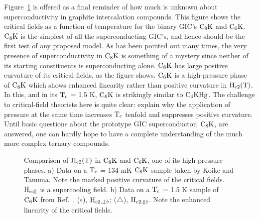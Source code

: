         Figure~\ref{c6k}  is offered as  a   final reminder of  how  much  is
unknown about superconductivity in graphite  intercalation compounds.  This
figure shows  the  critical  fields as a  function  of temperature  for the
binary GIC's $\rm C_8K$ and $\rm C_6K$.  $\rm C_8K$ is  the simplest of all
the superconducting  GIC's, and  hence  should be  the  first  test of  any
proposed model.  As has been  pointed out many times,  the very presence of
superconductivity in $\rm C_8K$ is something of a mystery since  neither of
its starting  constituents   is superconducting  alone.\cite{takada82,M143}
$\rm C_8K$  has large  positive curvature   of its critical  fields, as the
figure  shows.  $\rm  C_6K$ is  a high-pressure  phase of  $\rm C_8K$ which
shows  enhanced  linearity  rather    than   positive   curvature  in  $\rm
H_{c2}(T)$.\cite{avdeev87}   In  this,   and in   its  $\rm     T_c$ =  1.5
K,\cite{avdeev87} $\rm  C_6K$ is strikingly similar   to $\rm C_4KHg$.  The
challenge to critical-field theorists here is quite  clear: explain why the
application of pressure at  the same time increases  $\rm T_c$  tenfold and
suppresses  positive curvature.   Until basic questions about the prototype
GIC superconductor, $\rm C_8K$, are answered, one can hardly hope to have a
complete understanding of the much more complex ternary compounds.

\begin{figure}
\vspace{16cm}
\caption[Comparison of $\rm H_{c2}(T)$ in $\rm C_8K$ and $\rm
C_6K$.]{Comparison of $\rm H_{c2}(T)$ in $\rm C_8K$ and  $\rm C_6K$, one of
its high-pressure phases.   a)  Data  on a $\rm  T_c$ = 134  mK $\rm  C_8K$
sample taken by  Koike  and Tanuma.\cite{koike80} Note the  marked positive
curvature of the critical fields.  $\rm  H_{sc\parallel}$ is a supercooling
field.   b) Data on  a $\rm  T_c$  = 1.5    K  sample of  $\rm  C_6K$  from
Ref.~\cite{avdeev87}.    ($\circ$),    $\rm    H_{c2,   \perp    \hat{c}}$;
($\bigtriangleup$), $\rm H_{c2, \parallel   \hat{c}}$.  Note the   enhanced
linearity of the critical fields.}
\label{c6k}
\end{figure}

